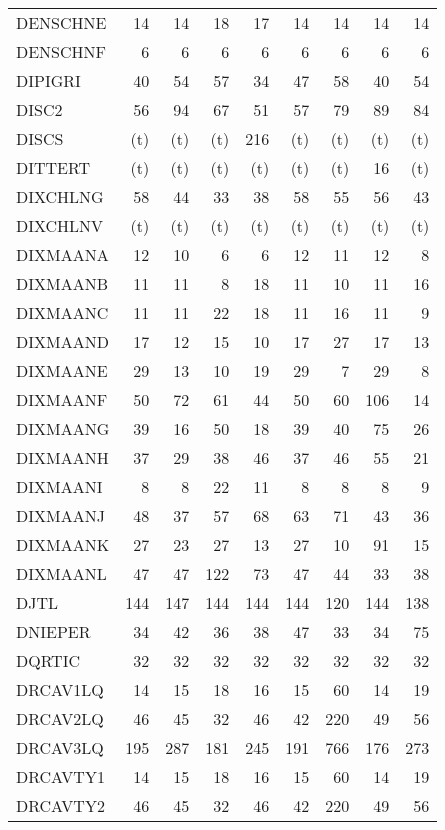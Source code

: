 \documentclass[11pt,twoside]{article}
\begin{document}
{\begin{longtable}[c]{|l|r|r|r|r|r|r|r|r|}
 DENSCHNE & 14 & 14 & 18 & 17 & 14 & 14 & 14 & 14 \\
 DENSCHNF & 6 & 6 & 6 & 6 & 6 & 6 & 6 & 6 \\
 DIPIGRI & 40 & 54 & 57 & 34 & 47 & 58 & 40 & 54 \\
 DISC2 & 56 & 94 & 67 & 51 & 57 & 79 & 89 & 84 \\
 DISCS & (t) & (t) & (t) & 216 & (t) & (t) & (t) & (t) \\
 DITTERT & (t) & (t) & (t) & (t) & (t) & (t) & 16 & (t) \\
 DIXCHLNG & 58 & 44 & 33 & 38 & 58 & 55 & 56 & 43 \\
 DIXCHLNV & (t) & (t) & (t) & (t) & (t) & (t) & (t) & (t) \\
 DIXMAANA & 12 & 10 & 6 & 6 & 12 & 11 & 12 & 8 \\
 DIXMAANB & 11 & 11 & 8 & 18 & 11 & 10 & 11 & 16 \\
 DIXMAANC & 11 & 11 & 22 & 18 & 11 & 16 & 11 & 9 \\
 DIXMAAND & 17 & 12 & 15 & 10 & 17 & 27 & 17 & 13 \\
 DIXMAANE & 29 & 13 & 10 & 19 & 29 & 7 & 29 & 8 \\
 DIXMAANF & 50 & 72 & 61 & 44 & 50 & 60 & 106 & 14 \\
 DIXMAANG & 39 & 16 & 50 & 18 & 39 & 40 & 75 & 26 \\
 DIXMAANH & 37 & 29 & 38 & 46 & 37 & 46 & 55 & 21 \\
 DIXMAANI & 8 & 8 & 22 & 11 & 8 & 8 & 8 & 9 \\
 DIXMAANJ & 48 & 37 & 57 & 68 & 63 & 71 & 43 & 36 \\
 DIXMAANK & 27 & 23 & 27 & 13 & 27 & 10 & 91 & 15 \\
 DIXMAANL & 47 & 47 & 122 & 73 & 47 & 44 & 33 & 38 \\
 DJTL & 144 & 147 & 144 & 144 & 144 & 120 & 144 & 138 \\
 DNIEPER & 34 & 42 & 36 & 38 & 47 & 33 & 34 & 75 \\
 DQRTIC & 32 & 32 & 32 & 32 & 32 & 32 & 32 & 32 \\
 DRCAV1LQ & 14 & 15 & 18 & 16 & 15 & 60 & 14 & 19 \\
 DRCAV2LQ & 46 & 45 & 32 & 46 & 42 & 220 & 49 & 56 \\
 DRCAV3LQ & 195 & 287 & 181 & 245 & 191 & 766 & 176 & 273 \\
 DRCAVTY1 & 14 & 15 & 18 & 16 & 15 & 60 & 14 & 19 \\
 DRCAVTY2 & 46 & 45 & 32 & 46 & 42 & 220 & 49 & 56 \\

\end{longtable}}
\end{document}
